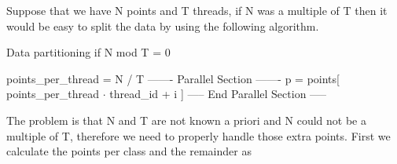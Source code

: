 \documentclass{report}
\begin{document}
\begin{minipage}[b]{0.48\textwidth}
    Suppose that we have N points and T threads, if N was a multiple of T then it would be easy to split the data by using the following algorithm.

    \begin{algorithm}[H]
        \caption{Data partitioning if N mod T = 0}
        \begin{algorithmic}
          \State points\_per\_thread = N / T
          \State ------- Parallel Section -------
            \State p = points[ points\_per\_thread $\cdot$ thread\_id + i ]
          \EndFor
          \State ----- End Parallel Section -----
        \end{algorithmic}
    \end{algorithm}

    The problem is that N and T are not known a priori and N could not be a multiple of T, therefore we need to properly handle those extra points. First we calculate the points per class and the remainder as
\end{minipage}

\newpage
\end{document}
